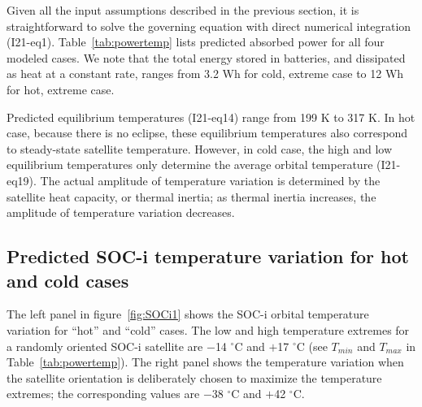 \documentclass[]{aastex62}
\begin{document}
Given all the input assumptions described in the previous section, it is straightforward to solve the
governing equation with direct numerical integration (I21-eq1). Table~\ref{tab:powertemp} lists predicted 
absorbed power for all four modeled cases.  We note that the total energy stored in batteries, and 
dissipated as heat at a constant rate, ranges from 3.2 Wh for cold, extreme case to 12 Wh for hot, extreme
case. 

Predicted equilibrium temperatures (I21-eq14) range from 199 K to 317 K. In hot case, because there
is no eclipse, these equilibrium temperatures also correspond to steady-state satellite temperature.
However, in cold case, the high and low equilibrium temperatures only determine the average orbital
temperature (I21-eq19). The actual amplitude of temperature variation is determined by the satellite
heat capacity, or thermal inertia; as thermal inertia increases, the amplitude of temperature variation 
decreases. 

 
\subsection{Predicted SOC-i temperature variation for hot and cold cases} 


The left panel in figure~\ref{fig:SOCi1} shows the SOC-i orbital temperature variation  for ``hot''
and ``cold'' cases. The low and high temperature extremes for a randomly oriented SOC-i satellite 
are $-$14 $^\circ$C and $+$17 $^\circ$C (see $T_{min}$ and $T_{max}$ in Table~\ref{tab:powertemp}). 
The right panel shows the temperature variation when the satellite orientation is deliberately chosen 
to maximize the temperature extremes; the corresponding values are $-$38 $^\circ$C and $+$42 $^\circ$C.  
 
\end{document}
